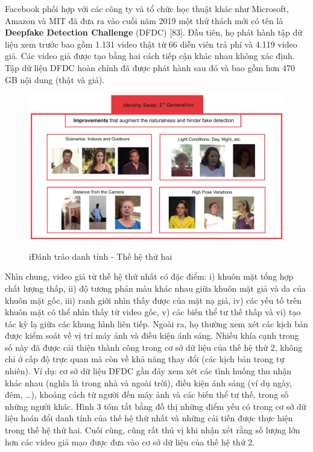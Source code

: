 \documentclass{article}
\begin{document}
Facebook phối hợp với các công ty và tổ chức học thuật khác như Microsoft, Amazon và MIT đã đưa ra vào cuối năm 2019 một thử thách mới có tên là \textbf{Deepfake Detection Challenge} (DFDC) [83]. Đầu tiên, họ phát hành tập dữ liệu xem trước bao gồm 1.131 video thật từ 66 diễn viên trả phí và 4.119 video giả. Các video giả được tạo bằng hai cách tiếp cận khác nhau không xác định. Tập dữ liệu DFDC hoàn chỉnh đã được phát hành sau đó và bao gồm hơn 470 GB nội dung (thật và giả).

\begin{figure}[h!]
\caption{iĐánh tráo danh tính - Thế hệ thứ hai}
\includegraphics[width=\columnwidth]{fig-4-id-swap-gen2}
\label{fig-4-id-swap-gen2}
\end{figure}

Nhìn chung, video giả từ thế hệ thứ nhất có đặc điểm: i) khuôn mặt tổng hợp chất lượng thấp, ii) độ tương phản màu khác nhau giữa khuôn mặt giả và da của khuôn mặt gốc, iii) ranh giới nhìn thấy được của mặt nạ giả, iv) các yếu tố trên khuôn mặt có thể nhìn thấy từ video gốc, v) các biến thể tư thế thấp và vi) tạo tác kỳ lạ giữa các khung hình liên tiếp. Ngoài ra, họ thường xem xét các kịch bản được kiểm soát về vị trí máy ảnh và điều kiện ánh sáng. Nhiều khía cạnh trong số này đã được cải thiện thành công trong cơ sở dữ liệu của thế hệ thứ 2, không chỉ ở cấp độ trực quan mà còn về khả năng thay đổi (các kịch bản trong tự nhiên). Ví dụ: cơ sở dữ liệu DFDC gần đây xem xét các tình huống thu nhận khác nhau (nghĩa là trong nhà và ngoài trời), điều kiện ánh sáng (ví dụ ngày, đêm, …), khoảng cách từ người đến máy ảnh và các biến thể tư thế, trong số những người khác. Hình 3 tóm tắt bằng đồ thị những điểm yếu có trong cơ sở dữ liệu hoán đổi danh tính của thế hệ thứ nhất và những cải tiến được thực hiện trong thế hệ thứ hai. Cuối cùng, cũng rất thú vị khi nhận xét rằng số lượng lớn hơn các video giả mạo được đưa vào cơ sở dữ liệu của thế hệ thứ 2.
\end{document}
